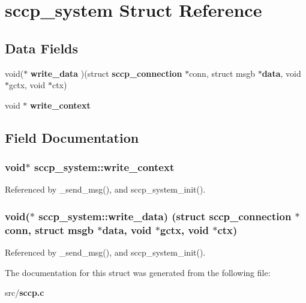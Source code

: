\section{sccp\+\_\+system Struct Reference}
\label{structsccp__system}
\subsection*{Data Fields}
\begin{DoxyCompactItemize}
\item 
void($\ast$ {\bf write\+\_\+data} )(struct {\bf sccp\+\_\+connection} $\ast$conn, struct msgb $\ast${\bf data}, void $\ast$gctx, void $\ast$ctx)
\item 
void $\ast$ {\bf write\+\_\+context}
\end{DoxyCompactItemize}


\subsection{Field Documentation}
\subsubsection[{write\+\_\+context}]{\setlength{\rightskip}{0pt plus 5cm}void$\ast$ sccp\+\_\+system\+::write\+\_\+context}\label{structsccp__system_a1f25bcaae85e0b7f3e81d1e41146cfa6}


Referenced by \+\_\+send\+\_\+msg(), and sccp\+\_\+system\+\_\+init().

\subsubsection[{write\+\_\+data}]{\setlength{\rightskip}{0pt plus 5cm}void($\ast$ sccp\+\_\+system\+::write\+\_\+data) (struct {\bf sccp\+\_\+connection} $\ast$conn, struct msgb $\ast${\bf data}, void $\ast$gctx, void $\ast$ctx)}\label{structsccp__system_aaf7289fecc917b03b12f6b2b985f59fa}


Referenced by \+\_\+send\+\_\+msg(), and sccp\+\_\+system\+\_\+init().



The documentation for this struct was generated from the following file\+:\begin{DoxyCompactItemize}
\item 
src/{\bf sccp.\+c}\end{DoxyCompactItemize}
